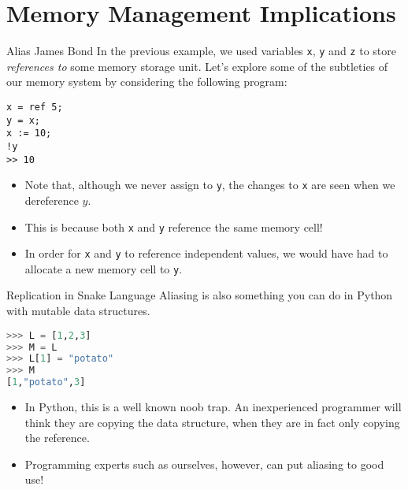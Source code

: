 \documentclass[11pt]{beamer}
\begin{document}
\section[Memory]{Memory Management Implications}
\begin{frame}[fragile=singleslide]{Alias James Bond}
In the previous example, we used variables \texttt{x}, \texttt{y} and \texttt{z} to store \emph{references to} some memory storage unit.  Let's explore some of the subtleties of our memory system by considering the following program:
\begin{lstlisting}[style=C]
x = ref 5;
y = x;
x := 10;
!y
>> 10
\end{lstlisting}
\begin{itemize}
\item Note that, although we never assign to \texttt{y}, the changes to \texttt{x} are seen when we dereference $y$.
\item This is because both \texttt{x} and \texttt{y} reference the same memory cell!
\item In order for \texttt{x} and \texttt{y} to reference independent values, we would have had to allocate a new memory cell to \texttt{y}. 
\end{itemize}
\end{frame}


\begin{frame}[fragile=singleslide]{Replication in Snake Language}
Aliasing is also something you can do in Python with mutable data structures.

\begin{lstlisting}[style=C, language=python]
>>> L = [1,2,3]
>>> M = L
>>> L[1] = "potato"
>>> M
[1,"potato",3]
\end{lstlisting}
\begin{itemize}
\item In Python, this is a well known noob trap.  An inexperienced programmer will think they are copying the data structure, when they are in fact only copying the reference.
\item Programming experts such as ourselves, however, can put aliasing to good use! 
\end{itemize}
\end{frame}
\end{document}
